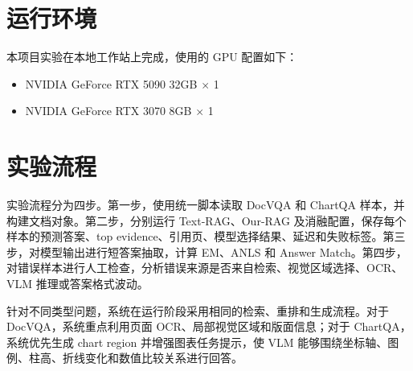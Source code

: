 \section{运行环境}

本项目实验在本地工作站上完成，使用的 GPU 配置如下：

\begin{itemize}
  \item NVIDIA GeForce RTX 5090 32GB $\times$ 1
  \item NVIDIA GeForce RTX 3070 8GB $\times$ 1
\end{itemize}

\section{实验流程}

实验流程分为四步。第一步，使用统一脚本读取 DocVQA 和 ChartQA 样本，并构建文档对象。第二步，分别运行 Text-RAG、Our-RAG 及消融配置，保存每个样本的预测答案、top evidence、引用页、模型选择结果、延迟和失败标签。第三步，对模型输出进行短答案抽取，计算 EM、ANLS 和 Answer Match。第四步，对错误样本进行人工检查，分析错误来源是否来自检索、视觉区域选择、OCR、VLM 推理或答案格式波动。

针对不同类型问题，系统在运行阶段采用相同的检索、重排和生成流程。对于 DocVQA，系统重点利用页面 OCR、局部视觉区域和版面信息；对于 ChartQA，系统优先生成 chart region 并增强图表任务提示，使 VLM 能够围绕坐标轴、图例、柱高、折线变化和数值比较关系进行回答。
